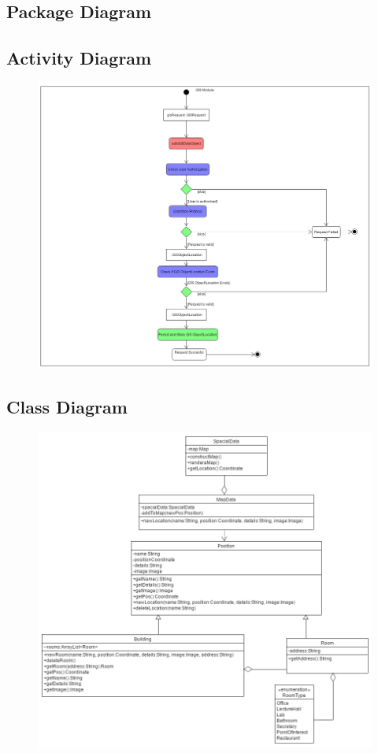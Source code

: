 \subsection{Package Diagram}

\subsection{Activity Diagram}
\begin{figure}[!htbp]
	\includegraphics[width=\textwidth]{GIS/GIS_Activity-addGISObject.png}
\end{figure}

\subsection{Class Diagram}
\begin{figure}[!htbp]
	\includegraphics[width=\textwidth]{GIS/GIS_Class_Diagram.png}
\end{figure}